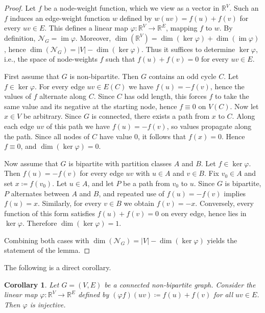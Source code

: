 \documentclass{article}
\theoremstyle{plain}
\newtheorem{cor}[thm]{Corollary}
\theoremstyle{definition}
\DeclareMathOperator\im{im}
\newcommand{\bR}{\mathbb{R}}
\begin{document}
\begin{proof}
    Let $f$ be a node-weight function, which we view as a vector in $\mathbb{R}^{V}$. Such an $f$ induces an edge-weight function $w$ defined by $w(uv)=f(u)+f(v)$ for every $uv\in E$. This defines a linear map $\varphi\colon\mathbb{R}^{V}\to\mathbb{R}^{E}$, mapping $f$ to $w$. By definition, $\mathcal{N}_G=\im \varphi$. Moreover, $\dim( \mathbb{R}^{V})=\dim(\ker \varphi)+\dim(\im \varphi)$, hence $\dim (\mathcal{N}_G)=|V|-\dim(\ker \varphi)$. Thus it suffices to determine $\ker \varphi$, i.e., the space of node-weights $f$ such that $f(u)+f(v)=0$ for every $uv\in E$.
    
    First assume that $G$ is non-bipartite. Then $G$ contains an odd cycle $C$. Let $f\in\ker \varphi$. For every edge $uv\in E(C)$ we have $f(u)=-f(v)$, hence the values of $f$ alternate along $C$. Since $C$ has odd length, this forces $f$ to take the same value and its negative at the starting node, hence $f\equiv 0$ on $V(C)$. Now let $x\in V$ be arbitrary. Since $G$ is connected, there exists a path from $x$ to $C$. Along each edge $uv$ of this path we have $f(u)=-f(v)$, so values propagate along the path. Since all nodes of $C$ have value $0$, it follows that $f(x)=0$. Hence $f\equiv 0$, and $\dim(\ker \varphi)=0$.
    
    Now assume that $G$ is bipartite with partition classes $A$ and $B$. Let $f\in\ker \varphi$. Then $f(u)=-f(v)$ for every edge $uv$ with $u\in A$ and $v\in B$. Fix $v_0\in A$ and set $x\coloneqq f(v_0)$. Let $u\in A$, and let $P$ be a path from $v_0$ to $u$. Since $G$ is bipartite, $P$ alternates between $A$ and $B$, and repeated use of $f(u)=-f(v)$ implies $f(u)=x$. Similarly, for every $v\in B$ we obtain $f(v)=-x$. Conversely, every function of this form satisfies $f(u)+f(v)=0$ on every edge, hence lies in $\ker \varphi$. Therefore $\dim(\ker \varphi)=1$.
    
    Combining both cases with $\dim (\mathcal{N}_G)=|V|-\dim(\ker \varphi)$ yields the statement of the lemma.    
\end{proof}

The following is a direct corollary.

\begin{cor}\label{cor:injective}
    Let $G = (V, E)$ be a connected non-bipartite graph. Consider the linear map $\varphi\colon\bR^V\to\bR^E$ defined by $(\varphi f)(uv)\coloneqq f(u)+f(v)$ for all $uv\in E$. Then $\varphi$ is injective.
\end{cor}
\end{document}
